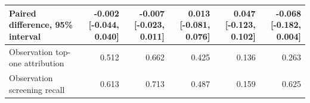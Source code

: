 \begin{table}[t]
\begin{tabular}{lrrrrr}
Paired difference, 95\% interval & \shortstack{-0.002\\{}[-0.044, 0.040]} & \shortstack{-0.007\\{}[-0.023, 0.011]} & \shortstack{0.013\\{}[-0.081, 0.076]} & \shortstack{0.047\\{}[-0.123, 0.102]} & \shortstack{-0.068\\{}[-0.182, 0.004]} \\
\midrule
Observation top-one attribution & 0.512 & 0.662 & 0.425 & 0.136 & 0.263 \\
Observation screening recall & 0.613 & 0.713 & 0.487 & 0.159 & 0.625 \\
\bottomrule
\end{tabular}
\end{table}
